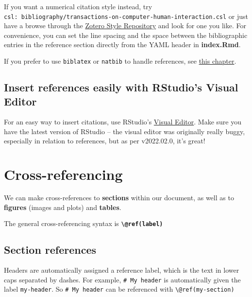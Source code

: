\documentclass[a4paper, nobind]{templates/ociamthesis}
\begin{document}
If you want a numerical citation style instead, try \texttt{csl:\ bibliography/transactions-on-computer-human-interaction.csl} or just have a browse through the \href{https://www.zotero.org/styles}{Zotero Style Repository} and look for one you like.
For convenience, you can set the line spacing and the space between the bibliographic entries in the reference section directly from the YAML header in \textbf{index.Rmd}.

If you prefer to use \texttt{biblatex} or \texttt{natbib} to handle references, see \protect\hyperlink{customising-citations}{this chapter}.

\clearpage

\hypertarget{insert-references-easily-with-rstudios-visual-editor-1}{%
\subsection{Insert references easily with RStudio's Visual Editor}\label{insert-references-easily-with-rstudios-visual-editor-1}}

For an easy way to insert citations, use RStudio's \href{https://rstudio.github.io/visual-markdown-editing/citations.html}{Visual Editor}.
Make sure you have the latest version of RStudio -- the visual editor was originally really buggy, especially in relation to references, but as per v2022.02.0, it's great!

\hypertarget{cross-referencing-1}{%
\section{Cross-referencing}\label{cross-referencing-1}}

We can make cross-references to \textbf{sections} within our document, as well as to \textbf{figures} (images and plots) and \textbf{tables}.

The general cross-referencing syntax is \textbf{\texttt{\textbackslash{}@ref(label)}}

\hypertarget{section-references-1}{%
\subsection{Section references}\label{section-references-1}}

Headers are automatically assigned a reference label, which is the text in lower caps separated by dashes. For example, \texttt{\#\ My\ header} is automatically given the label \texttt{my-header}. So \texttt{\#\ My\ header} can be referenced with \texttt{\textbackslash{}@ref(my-section)}
\end{document}
